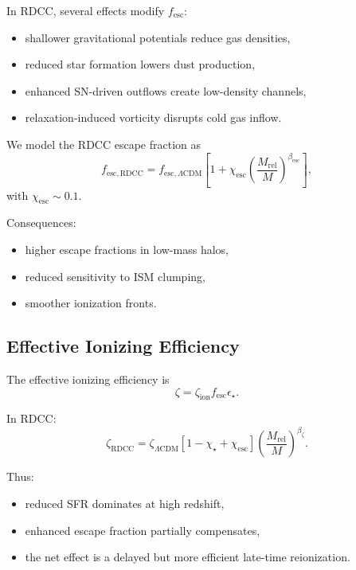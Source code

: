 \documentclass[11pt,a4paper]{article}
\begin{document}
In RDCC, several effects modify $f_{\mathrm{esc}}$:
\begin{itemize}
\item shallower gravitational potentials reduce gas densities,
\item reduced star formation lowers dust production,
\item enhanced SN-driven outflows create low-density channels,
\item relaxation-induced vorticity disrupts cold gas inflow.
\end{itemize}

We model the RDCC escape fraction as
\begin{equation}
f_{\mathrm{esc,RDCC}}
=
f_{\mathrm{esc},\Lambda\mathrm{CDM}}
\left[
1
+
\chi_{\mathrm{esc}}
\left(
\frac{M_{\mathrm{rel}}}{M}
\right)^{\beta_{\mathrm{esc}}}
\right],
\end{equation}
with $\chi_{\mathrm{esc}} \sim 0.1$.

Consequences:
\begin{itemize}
\item higher escape fractions in low-mass halos,
\item reduced sensitivity to ISM clumping,
\item smoother ionization fronts.
\end{itemize}

\subsection{Effective Ionizing Efficiency}

The effective ionizing efficiency is
\begin{equation}
\zeta
=
\zeta_{\mathrm{ion}}
f_{\mathrm{esc}}
\epsilon_{\star}.
\end{equation}

In RDCC:
\begin{equation}
\zeta_{\mathrm{RDCC}}
=
\zeta_{\Lambda\mathrm{CDM}}
\left[
1
-
\chi_{\star}
+
\chi_{\mathrm{esc}}
\right]
\left(
\frac{M_{\mathrm{rel}}}{M}
\right)^{\beta_{\zeta}}.
\end{equation}

Thus:
\begin{itemize}
\item reduced SFR dominates at high redshift,
\item enhanced escape fraction partially compensates,
\item the net effect is a delayed but more efficient late-time reionization.
\end{itemize}
\end{document}
